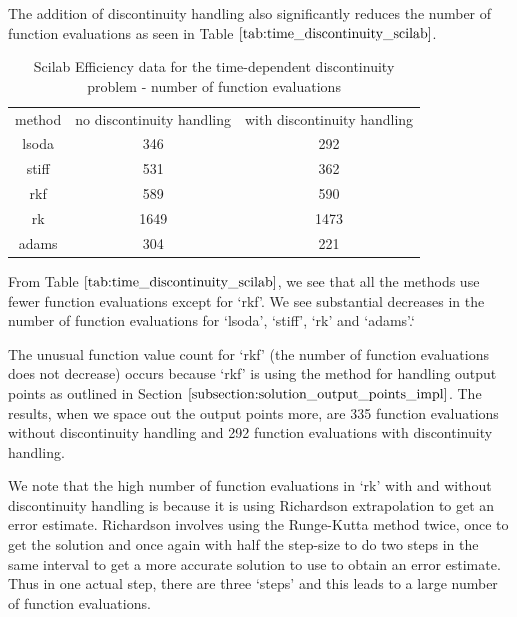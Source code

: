 The addition of discontinuity handling also significantly reduces the number of function evaluations as seen in Table $\ref{tab:time_discontinuity_scilab}$.

\begin{table}[H]
\caption {Scilab Efficiency data for the time-dependent discontinuity problem - number of function evaluations} 
\label{tab:time_discontinuity_scilab} 
\begin{center}
\begin{tabular}{ c c c }
method & no discontinuity handling & with discontinuity handling \\ 
lsoda & 346 & 292 \\
stiff & 531 & 362 \\
rkf & 589 & 590 \\
rk & 1649 & 1473 \\
adams & 304 & 221 \\
\end{tabular}
\end{center}
\end{table}

From Table $\ref{tab:time_discontinuity_scilab}$, we see that all the methods use fewer function evaluations except for `rkf'. We see substantial decreases in the number of function evaluations for `lsoda', `stiff', `rk' and `adams'.`

The unusual function value count for `rkf' (the number of function evaluations does not decrease) occurs because `rkf' is using the method for handling output points as outlined in Section $\ref{subsection:solution_output_points_impl}$. The results, when we space out the output points more, are 335 function evaluations without discontinuity handling and 292 function evaluations with discontinuity handling.

We note that the high number of function evaluations in `rk' with and without discontinuity handling is because it is using Richardson extrapolation to get an error estimate. Richardson involves using the Runge-Kutta method twice, once to get the solution and once again with half the step-size to do two steps in the same interval to get a more accurate solution to use to obtain an error estimate. Thus in one actual step, there are three `steps' and this leads to a large number of function evaluations.

